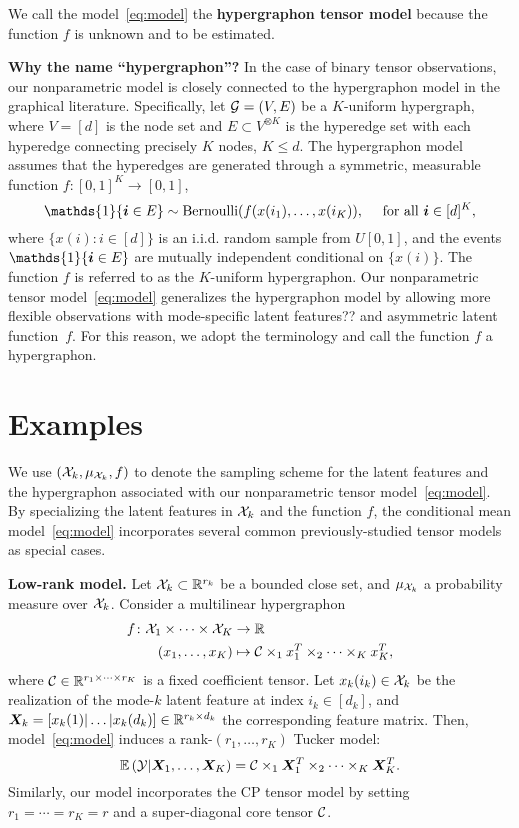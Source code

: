 \documentclass[11pt]{article}
\theoremstyle{plain}
\theoremstyle{definition}
\begin{document}
We call the model~\eqref{eq:model} the {\bf hypergraphon tensor model} because the function $f$ is unknown and to be estimated. 

{\bf Why the name ``hypergraphon''?}
In the case of binary tensor observations, our nonparametric model is closely connected to the hypergraphon model in the graphical literature. Specifically, let $\mathcal{G}=(V, E)$ be a $K$-uniform hypergraph, where $V=[d]$ is the node set and $E\subset V^{\otimes K}$ is the hyperedge set with each hyperedge connecting precisely $K$ nodes, $K\leq d$. The hypergraphon model assumes that the hyperedges are generated through a symmetric, measurable function $f\colon[0,1]^K \to [0,1]$,
\[
\mathds{1}\{\mi\in E\} \sim \text{Bernoulli}(f(x(i_1), \ldots,x(i_K)),\quad \text{ for all }\mi\in[d]^K,
\]
where $\{x(i)\colon i\in[d]\}$ is an i.i.d. random sample from $U[0,1]$, and the events $\mathds{1}\{\mi\in E\}$ are mutually independent conditional on $\{x(i)\}$. The function $f$ is referred to as the $K$-uniform hypergraphon. Our nonparametric tensor model~\eqref{eq:model} generalizes the hypergraphon model by allowing more flexible observations with {\color{red}mode-specific latent features??} and asymmetric latent function~$f$. For this reason, we adopt the terminology and call the function $f$ a hypergraphon. 

\section{Examples}
We use $(\mathcal{X}_k, \mu_{\mathcal{X}_k}, f)$ to denote the sampling scheme for the latent features and the hypergraphon associated with our nonparametric tensor model~\eqref{eq:model}. By specializing the latent features in $\mathcal{X}_k$ and the function $f$, the conditional mean model~\eqref{eq:model} incorporates several common previously-studied tensor models as special cases. 

{\bf Low-rank model.} Let $\mathcal{X}_k\subset\mathbb{R}^{r_k}$ be a bounded close set, and $\mu_{\mathcal{X}_k}$ a probability measure over $\mathcal{X}_k$. Consider a multilinear hypergraphon
\begin{align}\label{eq:linear}
f\colon \mathcal{X}_1\times \cdots \times \mathcal{X}_K &\to \mathbb{R}\\
(x_1,\ldots,x_K) &\mapsto \mathcal{C}\times_1 x^T_1\times_2\cdots\times_K x^T_K,
\end{align}
where $\mathcal{C}\in\mathbb{R}^{r_1\times \cdots \times r_K}$ is a fixed coefficient tensor. Let $x_k(i_k)\in \mathcal{X}_k$ be the realization of the mode-$k$ latent feature at index $i_k\in[d_k]$, and $\bm X_k=[x_k(1)|\ldots|x_k(d_k)]\in\mathbb{R}^{r_k\times d_k}$ the corresponding feature matrix. Then, model~\eqref{eq:model} induces a rank-$(r_1,\ldots,r_K)$ Tucker model:
\begin{equation}\label{eq:Tucker}
\mathbb{E}\left(\mathcal{Y}|\bm X_1,\ldots,\bm X_K\right)=\mathcal{C}\times_1\bm X^T_1\times_2\cdots \times_K \bm X^T_K.
\end{equation}
Similarly, our model incorporates the CP tensor model by setting $r_1=\cdots=r_K=r$ and a super-diagonal core tensor $\mathcal{C}$.
\end{document}
